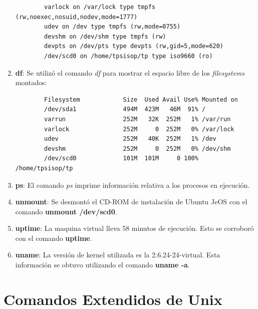 \documentclass[a4paper,11pt] {article}
\begin{document}
\begin{enumerate}
\begin{verbatim}
		varlock on /var/lock type tmpfs (rw,noexec,nosuid,nodev,mode=1777)
		udev on /dev type tmpfs (rw,mode=0755)
		devshm on /dev/shm type tmpfs (rw)
		devpts on /dev/pts type devpts (rw,gid=5,mode=620)
		/dev/scd0 on /home/tpsisop/tp type iso9660 (ro)
	\end{verbatim}
	\item \textbf{df}: Se utiliz\'o el comando \textit{df} para mostrar el espacio libre de los \textit{filesystems} montados:
	\begin{verbatim}
		Filesystem            Size  Used Avail Use% Mounted on
		/dev/sda1             494M  423M   46M  91% /
		varrun                252M   32K  252M   1% /var/run
		varlock               252M     0  252M   0% /var/lock
		udev                  252M   40K  252M   1% /dev
		devshm                252M     0  252M   0% /dev/shm
		/dev/scd0             101M  101M     0 100% /home/tpsisop/tp
	\end{verbatim}
	\item \textbf{ps}: El comando \textit{ps} imprime informaci\'on relativa a los procesos en ejecuci\'on.
	\item \textbf{unmount}: Se desmont\'o el CD-ROM de instalaci\'on de Ubuntu JeOS con el comando \textbf{unmount /dev/scd0}.
	\item \textbf{uptime}: La maquina virtual lleva 58 minutos de ejecuci\'on. Esto se corrobor\'o con el comando \textbf{uptime}.
	\item \textbf{uname}: La versi\'on de kernel utilizada es la 2.6.24-24-virtual. Esta informaci\'on se obtuvo utilizando el comando \textbf{uname -a}.

\end{enumerate}

\section{Comandos Extendidos de Unix}
\end{document}
